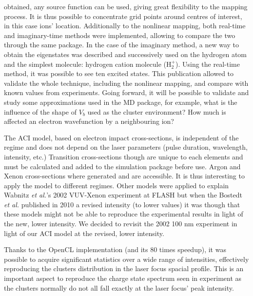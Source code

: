obtained, any source function can be used, giving great flexibility to the
mapping process. It is thus possible to concentrate grid points around centres
of interest, in this case ions' location. Additionally to the nonlinear mapping,
both real-time and imaginary-time methods were implemented, allowing to compare
the two through the same package. In the case of the imaginary method, a new
way to obtain the eigenstates was described and successively used on the
hydrogen atom and the simplest molecule: hydrogen cation molecule (H$_{2}^{+}$).
Using the real-time method, it was possible to see ten excited states. This
publication allowed to validate the whole technique, including the nonlinear
mapping, and compare with known values from experiments. Going forward, it will
be possible to validate and study some approximations used in the MD package,
for example, what is the influence of the shape of $V_b$ used as the cluster
environment? How much is affected an electron wavefunction by a neighbouring
ion?

The ACI model, based on electron impact cross-sections, is independent of the
regime and does not depend on the laser parameters (pulse duration, wavelength,
intensity, etc.) Transition cross-sections though are unique to each elements
and must be calculated and added to the simulation package before use. Argon
and Xenon cross-sections where generated and are accessible. It is thus
interesting to apply the model to different regimes. Other models were applied
to explain Wabnitz \textit{et al.}'s 2002 VUV-Xenon experiment at FLASH but when the
Bostedt \textit{et al.} published in 2010 a revised intensity (to lower values) it was
though that these models might not be able to reproduce the experimental results
in light of the new, lower intensity. We decided to revisit the 2002 100 nm
experiment in light of our ACI model at the revised, lower intensity.

Thanks to the OpenCL implementation (and its 80 times speedup), it was possible
to acquire significant statistics over a wide range of intensities, effectively
reproducing the clusters distribution in the laser focus spacial profile. This
is an important aspect to reproduce the charge state spectrum seen in experiment
as the clusters normally do not all fall exactly at the laser focus' peak
intensity.

